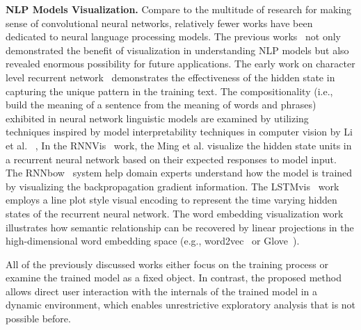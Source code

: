 \textbf{NLP Models Visualization.}
Compare to the multitude of research for making sense of convolutional neural networks, relatively fewer works have been dedicated to neural language processing models.
%
The previous works~\cite{KarpathyJohnson2015, LiChenHovy2015, StrobeltGehrmannPfister2018, LiuBremerJayaraman2018} not only demonstrated the benefit of visualization in understanding NLP models but also revealed enormous possibility for future applications.
The early work on character level recurrent network~\cite{KarpathyJohnson2015} demonstrates the effectiveness of the hidden state in capturing the unique pattern in the training text. The compositionality (i.e., build the meaning of a sentence from the meaning of words and phrases) exhibited in neural network linguistic models are examined by utilizing techniques inspired by model interpretability techniques in computer vision by Li et al. ~\cite{LiChenHovy2015}, 
In the RNNVis~\cite{MingCaoZhang2017} work, the Ming et al. visualize the hidden state units in a recurrent neural network based on their expected responses to model input.
The RNNbow~\cite{CashmanPattersonMosca2017} system help domain experts understand how the model is trained by visualizing the backpropagation gradient information.
The LSTMvis~\cite{StrobeltGehrmannPfister2018} work employs a line plot style visual encoding to represent the time varying hidden states of the recurrent neural network. The word embedding visualization work~\cite{LiuBremerJayaraman2018} illustrates how semantic relationship can be recovered by linear projections in the high-dimensional word embedding space (e.g., word2vec~\cite{MikolovSutskeverChen2013} or Glove~\cite{PenningtonSocherManning2014}).

All of the previously discussed works either focus on the training process or examine the trained model as a fixed object. In contrast, the proposed method allows direct user interaction with the internals of the trained model in a dynamic environment, which enables unrestrictive exploratory analysis that is not possible before.

